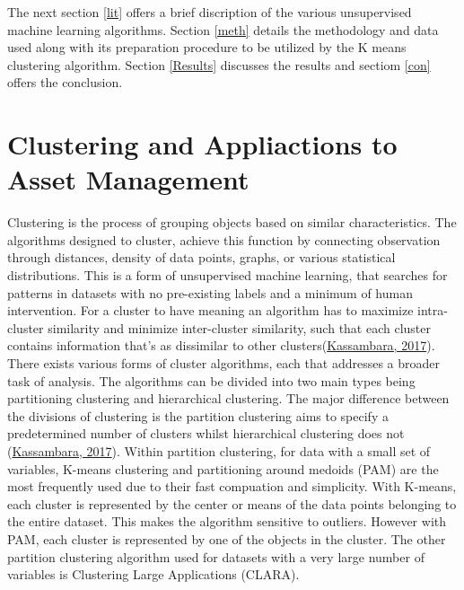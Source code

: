 \documentclass[11pt,preprint, authoryear]{elsarticle}
\numberwithin{equation}{section}
\numberwithin{figure}{section}
\numberwithin{table}{section}
\begin{document}
The next section \ref{lit} offers a brief discription of the various
unsupervised machine learning algorithms. Section \ref{meth} details the
methodology and data used along with its preparation procedure to be
utilized by the K means clustering algorithm. Section \ref{Results}
discusses the results and sectiom \ref{con} offers the conclusion.

\hypertarget{clustering-and-appliactions-to-asset-management}{%
\section{\texorpdfstring{Clustering and Appliactions to Asset Management
\label{lit}}{Clustering and Appliactions to Asset Management }}\label{clustering-and-appliactions-to-asset-management}}

Clustering is the process of grouping objects based on similar
characteristics. The algorithms designed to cluster, achieve this
function by connecting observation through distances, density of data
points, graphs, or various statistical distributions. This is a form of
unsupervised machine learning, that searches for patterns in datasets
with no pre-existing labels and a minimum of human intervention. For a
cluster to have meaning an algorithm has to maximize intra-cluster
similarity and minimize inter-cluster similarity, such that each cluster
contains information that's as dissimilar to other
clusters(\protect\hyperlink{ref-kassambara2017practical}{Kassambara,
2017}). There exists various forms of cluster algorithms, each that
addresses a broader task of analysis. The algorithms can be divided into
two main types being partitioning clustering and hierarchical
clustering. The major difference between the divisions of clustering is
the partition clustering aims to specify a predetermined number of
clusters whilst hierarchical clustering does not
(\protect\hyperlink{ref-kassambara2017practical}{Kassambara, 2017}).
Within partition clustering, for data with a small set of variables,
K-means clustering and partitioning around medoids (PAM) are the most
frequently used due to their fast compuation and simplicity. With
K-means, each cluster is represented by the center or means of the data
points belonging to the entire dataset. This makes the algorithm
sensitive to outliers. However with PAM, each cluster is represented by
one of the objects in the cluster. The other partition clustering
algorithm used for datasets with a very large number of variables is
Clustering Large Applications (CLARA).
\end{document}
